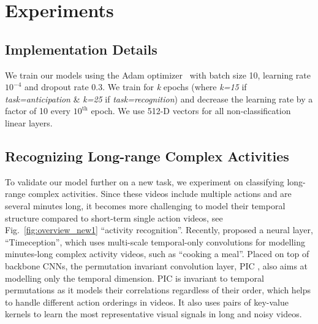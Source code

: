 \documentclass[10pt,twocolumn,letterpaper]{article}
\begin{document}
\section{Experiments}
\subsection{Implementation Details}
We train our models using the Adam optimizer~\cite{kingma2014adam} with batch size 10, learning rate $10^{-4}$ and dropout rate 0.3.
We train for {\it k} epochs (where {\it k=15} if {\it task=anticipation} \& {\it k=25} if {\it task=recognition}) and decrease the learning rate by a factor of 10 every $10^{\text{th}}$ epoch.
We use 512-D vectors for all non-classification linear layers. 

 
\subsection{Recognizing Long-range Complex Activities}


To validate our model further on a new task, we experiment on classifying long-range complex activities.
Since these videos include multiple actions and are several minutes long, it becomes more challenging to model their temporal structure compared to short-term single action videos, see Fig.~\ref{fig:overview_new1} ``activity recognition''.
Recently, \cite{hussein2019timeception} proposed a neural layer, ``Timeception'', which uses multi-scale temporal-only convolutions for modelling minutes-long complex activity videos, such as ``cooking a meal''. 
Placed on top of backbone CNNs, the permutation invariant convolution layer, PIC \cite{hussein2020pic}, also aims at modelling only the temporal dimension.
PIC is invariant to temporal permutations as it models their correlations regardless of their order, which helps to handle different action orderings in videos.
It also uses pairs of key-value kernels to learn the most representative visual signals in long and noisy videos.


\begin{table}[t]
\centering
{}
\caption{Model parameters for activity recognition on Breakfast.}
\label{tab:my_label_breakfast}
\end{table} 
\end{document}
